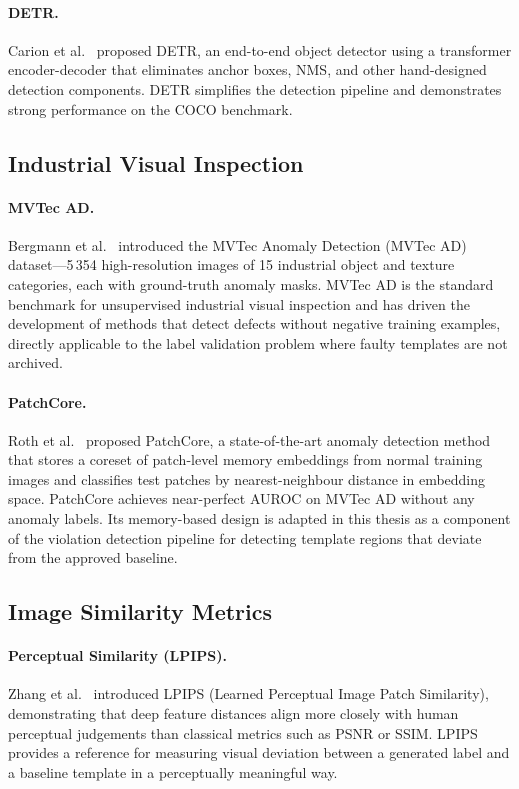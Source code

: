 \paragraph{DETR.}
Carion et al.~\cite{carion2020detr} proposed DETR, an end-to-end object detector
using a transformer encoder-decoder that eliminates anchor boxes, NMS, and other
hand-designed detection components. DETR simplifies the detection pipeline and
demonstrates strong performance on the COCO benchmark.

\subsection{Industrial Visual Inspection}
\label{ssec:inspection}

\paragraph{MVTec AD.}
Bergmann et al.~\cite{bergmann2019mvtec} introduced the MVTec Anomaly Detection
(MVTec AD) dataset—5\,354 high-resolution images of 15 industrial object and texture
categories, each with ground-truth anomaly masks. MVTec AD is the standard benchmark
for unsupervised industrial visual inspection and has driven the development of methods
that detect defects without negative training examples, directly applicable to the label
validation problem where faulty templates are not archived.

\paragraph{PatchCore.}
Roth et al.~\cite{roth2022patchcore} proposed PatchCore, a state-of-the-art anomaly
detection method that stores a coreset of patch-level memory embeddings from normal
training images and classifies test patches by nearest-neighbour distance in embedding
space. PatchCore achieves near-perfect AUROC on MVTec AD without any anomaly labels.
Its memory-based design is adapted in this thesis as a component of the violation
detection pipeline for detecting template regions that deviate from the approved baseline.

\subsection{Image Similarity Metrics}
\label{ssec:similarity}

\paragraph{Perceptual Similarity (LPIPS).}
Zhang et al.~\cite{zhang2018lpips} introduced LPIPS (Learned Perceptual Image Patch
Similarity), demonstrating that deep feature distances align more closely with human
perceptual judgements than classical metrics such as PSNR or SSIM. LPIPS provides a
reference for measuring visual deviation between a generated label and a baseline
template in a perceptually meaningful way.

